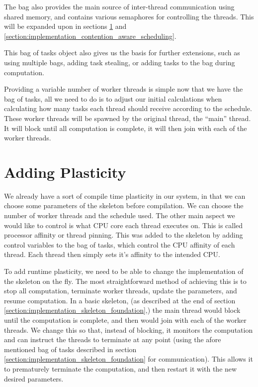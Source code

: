 The bag also provides the main source of inter-thread communication using shared memory, and contains various semaphores for controlling the threads. This will be expanded upon in sections \ref{section:implementation_adding_plasticity} and \ref{section:implementation_contention_aware_scheduling}.

This bag of tasks object also gives us the basis for further extensions, such as using multiple bags, adding task stealing, or adding tasks to the bag during computation.

Providing a variable number of worker threads is simple now that we have the bag of tasks, all we need to do is to adjust our initial calculations when calculating how many tasks each thread should receive according to the schedule. These worker threads will be spawned by the original thread, the ``main'' thread. It will block until all computation is complete, it will then join with each of the worker threads.



\section{Adding Plasticity}
\label{section:implementation_adding_plasticity}

We already have a sort of compile time plasticity in our system, in that we can choose some parameters of the skeleton before compilation. We can choose the number of worker threads and the schedule used. The other main aspect we would like to control is what CPU core each thread executes on. This is called processor affinity or thread pinning. This was added to the skeleton by adding control variables to the bag of tasks, which control the CPU affinity of each thread. Each thread then simply sets it's affinity to the intended CPU.

To add runtime plasticity, we need to be able to change the implementation of the skeleton on the fly. The most straightforward method of achieving this is to stop all computation, terminate worker threads, update the parameters, and resume computation. In a basic skeleton, (as described at the end of section \ref{section:implementation_skeleton_foundation},) the main thread would block until the computation is complete, and then would join with each of the worker threads. We change this so that, instead of blocking, it monitors the computation and can instruct the threads to terminate at any point (using the afore mentioned bag of tasks described in section \ref{section:implementation_skeleton_foundation} for communication). This allows it to prematurely terminate the computation, and then restart it with the new desired parameters. 

